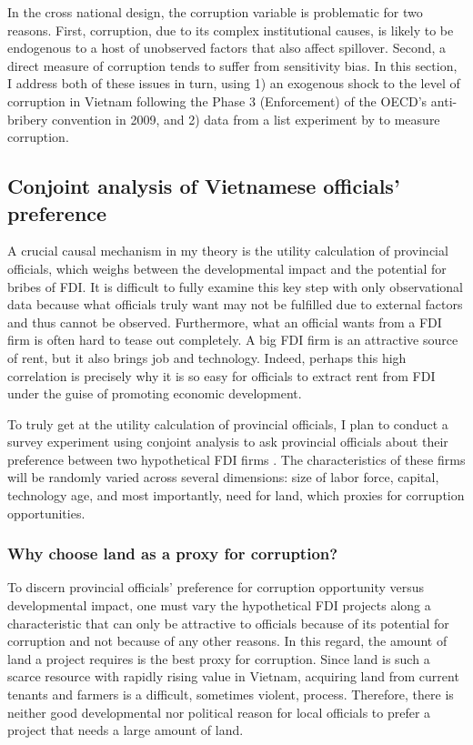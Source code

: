 In the cross national design, the corruption variable is problematic for two reasons. First, corruption, due to its complex institutional causes, is likely to be endogenous to a host of unobserved factors that also affect spillover. Second, a direct measure of corruption tends to suffer from sensitivity bias. In this section, I address both of these issues in turn, using 1) an exogenous shock to the level of corruption in Vietnam following the Phase 3 (Enforcement) of the OECD's anti-bribery convention in 2009, and 2) data from a list experiment by \citet{Malesky2015} to measure corruption.


\subsection{Conjoint analysis of Vietnamese officials' preference}

A crucial causal mechanism in my theory is the utility calculation of provincial officials, which weighs between the developmental impact and the potential for bribes of FDI. It is difficult to fully examine this key step with only observational data because what officials truly want may not be fulfilled due to external factors and thus cannot be observed. Furthermore, what an official wants from a FDI firm is often hard to tease out completely. A big FDI firm is an attractive source of rent, but it also brings job and technology. Indeed, perhaps this high correlation is precisely why it is so easy for officials to extract rent from FDI under the guise of promoting economic development.

To truly get at the utility calculation of provincial officials, I plan to conduct a survey experiment using conjoint analysis to ask provincial officials about their preference between two hypothetical FDI firms \citep{Hainmueller2014}. The characteristics of these firms will be randomly varied across several dimensions: size of labor force, capital, technology age, and most importantly, need for land, which proxies for corruption opportunities.

\subsubsection{Why choose land as a proxy for corruption?}

To discern provincial officials' preference for corruption opportunity versus developmental impact, one must vary the hypothetical FDI projects along a characteristic that can only be attractive to officials because of its potential for corruption and not because of any other reasons. In this regard, the amount of land a project requires is the best proxy for corruption. Since land is such a scarce resource with rapidly rising value in Vietnam, acquiring land from current tenants and farmers is a difficult, sometimes violent, process. Therefore, there is neither good developmental nor political reason for local officials to prefer a project that needs a large amount of land. 

